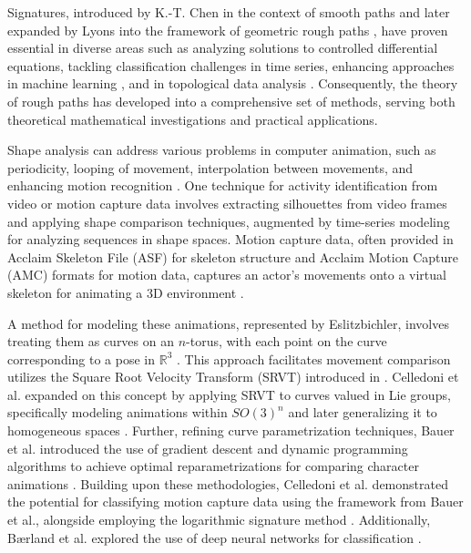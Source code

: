 
Signatures, introduced by K.-T. Chen in the context of smooth paths \cite{chenIteratedIntegralsExponential1954} and later expanded by Lyons into the framework of geometric rough paths \cite{lyonsDifferentialEquationsDriven1998}, have proven essential in diverse areas such as analyzing solutions to controlled differential equations, tackling classification challenges in time series, enhancing approaches in machine learning \cite{chevyrevPrimerSignatureMethod2016}, and in topological data analysis \cite{chevyrevPersistencePathsSignature2020}. Consequently, the theory of rough paths has developed into a comprehensive set of methods, serving both theoretical mathematical investigations and practical applications.


Shape analysis can address various problems in computer animation, such as periodicity, looping of movement, interpolation between movements, and enhancing motion recognition \cite{eslitzbichlerModellingCharacterMotions2015,celledoniShapeAnalysisLie2016,celledoniSignaturesShapeAnalysis2019,kovarAutomatedExtractionParameterization2004,pejsaStateArtExampleBased2010}. One technique for activity identification from video or motion capture data involves extracting silhouettes from video frames and applying shape comparison techniques, augmented by time-series modeling for analyzing sequences in shape spaces. Motion capture data, often provided in Acclaim Skeleton File (ASF) for skeleton structure and Acclaim Motion Capture (AMC) formats for motion data, captures an actor's movements onto a virtual skeleton for animating a 3D environment \cite{landerWorkingMotionCapture1998,adistambhaMotionClassificationUsing2008}.

A method for modeling these animations, represented by Eslitzbichler, involves treating them as curves on an \(n\)-torus, with each point on the curve corresponding to a pose in \(\mathbb{R}^3\) \cite{eslitzbichlerModellingCharacterMotions2015}. This approach facilitates movement comparison utilizes the Square Root Velocity Transform (SRVT) introduced in \cite{mioShapePlaneElastic2007, srivastavaShapeAnalysisElastic2011}. Celledoni et al. expanded on this concept by applying SRVT to curves valued in Lie groups, specifically modeling animations within \(SO(3)^n\) and later generalizing it to homogeneous spaces \cite{celledoniShapeAnalysisLie2016,celledoniShapeAnalysisHomogeneous2018}. Further, refining curve parametrization techniques, Bauer et al. introduced the use of gradient descent and dynamic programming algorithms to achieve optimal reparametrizations for comparing character animations \cite{bauerLandmarkGuidedElasticShape2015}. Building upon these methodologies, Celledoni et al. demonstrated the potential for classifying motion capture data using the framework from Bauer et al., alongside employing the logarithmic signature method \cite{celledoniSignaturesShapeAnalysis2019}. Additionally, Bærland et al. explored the use of deep neural networks for classification \cite{baerlandOptimalReparametrizationCurves2021}.

